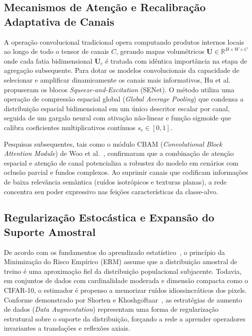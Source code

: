 \documentclass[runningheads]{llncs}
\begin{document}
\subsection{Mecanismos de Aten\c{c}\~{a}o e Recalibra\c{c}\~{a}o Adaptativa de Canais}
A opera\c{c}\~{a}o convolucional tradicional opera computando produtos internos locais ao longo de todo o tensor de canais $C$, gerando mapas volum\'{e}tricos $\mathbf{U} \in \mathbb{R}^{H \times W \times C}$ onde cada fatia bidimensional $\mathbf{U}_c$ \'{e} tratada com id\^{e}ntica import\^{a}ncia na etapa de agrega\c{c}\~{a}o subsequente. Para dotar os modelos convolucionais da capacidade de selecionar e amplificar dinamicamente os canais mais informativos, Hu et al.~\cite{hu2018squeeze} propuseram os blocos \textit{Squeeze-and-Excitation} (SENet). O m\'{e}todo utiliza uma opera\c{c}\~{a}o de compress\~{a}o espacial global (\textit{Global Average Pooling}) que condensa a distribui\c{c}\~{a}o espacial bidimensional em um \'{u}nico descritor escalar por canal, seguida de um gargalo neural com ativa\c{c}\~{a}o n\~{a}o-linear e fun\c{c}\~{a}o sigmoide que calibra coeficientes multiplicativos cont\'{i}nuos $s_c \in [0, 1]$.

Pesquisas subsequentes, tais como o m\'{o}dulo CBAM (\textit{Convolutional Block Attention Module}) de Woo et al.~\cite{woo2018cbam}, confirmaram que a combina\c{c}\~{a}o de aten\c{c}\~{a}o espacial e aten\c{c}\~{a}o de canal potencializa a robustez do modelo em cen\'{a}rios com oclus\~{a}o parcial e fundos complexos. Ao suprimir canais que codificam informa\c{c}\~{o}es de baixa relev\^{a}ncia sem\^{a}ntica (ru\'{i}dos isotr\'{o}picos e texturas planas), a rede concentra seu poder expressivo nas fei\c{c}\~{o}es caracter\'{i}sticas da classe-alvo.

\subsection{Regulariza\c{c}\~{a}o Estoc\'{a}stica e Expans\~{a}o do Suporte Amostral}
De acordo com os fundamentos do aprendizado estat\'{i}stico~\cite{goodfellow2016deep}, o princ\'{i}pio da Minimiza\c{c}\~{a}o do Risco Emp\'{i}rico (ERM) assume que a distribui\c{c}\~{a}o amostral de treino \'{e} uma aproxima\c{c}\~{a}o fiel da distribui\c{c}\~{a}o populacional subjacente. Todavia, em conjuntos de dados com cardinalidade moderada e dimens\~{a}o compacta como o CIFAR-10, o estimador \'{e} propenso a memorizar ru\'{i}dos idiossincr\'{a}ticos dos pixels. Conforme demonstrado por Shorten e Khoshgoftaar~\cite{shorten2019survey}, as estrat\'{e}gias de aumento de dados (\textit{Data Augmentation}) representam uma forma de regulariza\c{c}\~{a}o estrutural sobre o suporte da distribui\c{c}\~{a}o, for\c{c}ando a rede a aprender operadores invariantes a transla\c{c}\~{o}es e reflex\~{o}es axiais.
\end{document}
